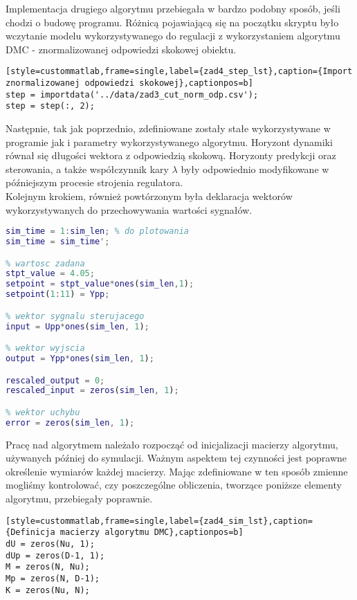 Implementacja drugiego algorytmu przebiegała w bardzo podobny sposób, jeśli chodzi o budowę programu. Różnicą pojawiającą się na początku skryptu było wczytanie modelu wykorzystywanego do regulacji z wykorzystaniem algorytmu DMC - znormalizowanej odpowiedzi skokowej obiektu.

\begin{lstlisting}
[style=custommatlab,frame=single,label={zad4_step_lst},caption={Import znormalizowanej odpowiedzi skokowej},captionpos=b]
step = importdata('../data/zad3_cut_norm_odp.csv');
step = step(:, 2);
\end{lstlisting}

Następnie, tak jak poprzednio, zdefiniowane zostały stałe wykorzystywane w programie jak i parametry wykorzystywanego algorytmu. Horyzont dynamiki równał się długości wektora z odpowiedzią skokową. Horyzonty predykcji oraz sterowania, a także współczynnik kary $\lambda$ były odpowiednio modyfikowane w późniejszym procesie strojenia regulatora. \\
\indent{} Kolejnym krokiem, również powtórzonym była deklaracja wektorów wykorzystywanych do przechowywania wartości sygnałów.

\begin{lstlisting}[language=Matlab]
% czas symulacji
sim_time = 1:sim_len; % do plotowania
sim_time = sim_time';

% wartosc zadana
stpt_value = 4.05;
setpoint = stpt_value*ones(sim_len,1);
setpoint(1:11) = Ypp;

% wektor sygnalu sterujacego
input = Upp*ones(sim_len, 1);

% wektor wyjscia
output = Ypp*ones(sim_len, 1);

rescaled_output = 0;
rescaled_input = zeros(sim_len, 1);

% wektor uchybu
error = zeros(sim_len, 1);

\end{lstlisting}

Pracę nad algorytmem należało rozpocząć od inicjalizacji macierzy algorytmu, używanych później do symulacji. Ważnym aspektem tej czynności jest poprawne określenie wymiarów każdej macierzy. Mając zdefiniowane w ten sposób zmienne mogliśmy kontrolować, czy poszczególne obliczenia, tworzące poniższe elementy algorytmu, przebiegały poprawnie.
\\

\begin{lstlisting}
[style=custommatlab,frame=single,label={zad4_sim_lst},caption={Definicja macierzy algorytmu DMC},captionpos=b]
dU = zeros(Nu, 1);
dUp = zeros(D-1, 1);
M = zeros(N, Nu);
Mp = zeros(N, D-1);
K = zeros(Nu, N);
\end{lstlisting}

